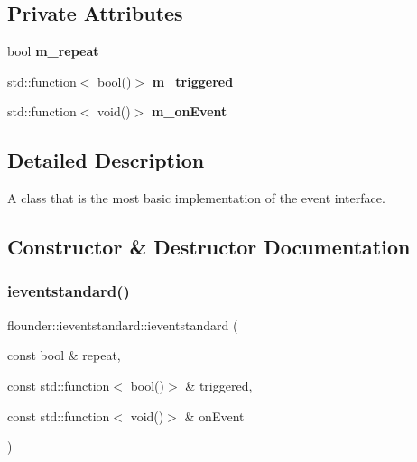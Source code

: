 \subsection*{Private Attributes}
\begin{DoxyCompactItemize}
\item 
\mbox{\label{classflounder_1_1ieventstandard_a3138ad3fde612d149bbd61bee76a7cbc}} 
bool {\bfseries m\+\_\+repeat}
\item 
\mbox{\label{classflounder_1_1ieventstandard_a4f07daf366203a2ee0d2a4692f721186}} 
std\+::function$<$ bool()$>$ {\bfseries m\+\_\+triggered}
\item 
\mbox{\label{classflounder_1_1ieventstandard_a71a2e491df790117c084f4ab6715620f}} 
std\+::function$<$ void()$>$ {\bfseries m\+\_\+on\+Event}
\end{DoxyCompactItemize}


\subsection{Detailed Description}
A class that is the most basic implementation of the event interface. 



\subsection{Constructor \& Destructor Documentation}
\mbox{\label{classflounder_1_1ieventstandard_a23b490b9bd74fee4250b2bd628c369c7}} 
\subsubsection{\texorpdfstring{ieventstandard()}{ieventstandard()}\hspace{0.1cm}{\footnotesize\ttfamily [1/2]}}
{\footnotesize\ttfamily flounder\+::ieventstandard\+::ieventstandard (\begin{DoxyParamCaption}\item[{const bool \&}]{repeat,  }\item[{const std\+::function$<$ bool()$>$ \&}]{triggered,  }\item[{const std\+::function$<$ void()$>$ \&}]{on\+Event }\end{DoxyParamCaption})\hspace{0.3cm}{\ttfamily [inline]}}



